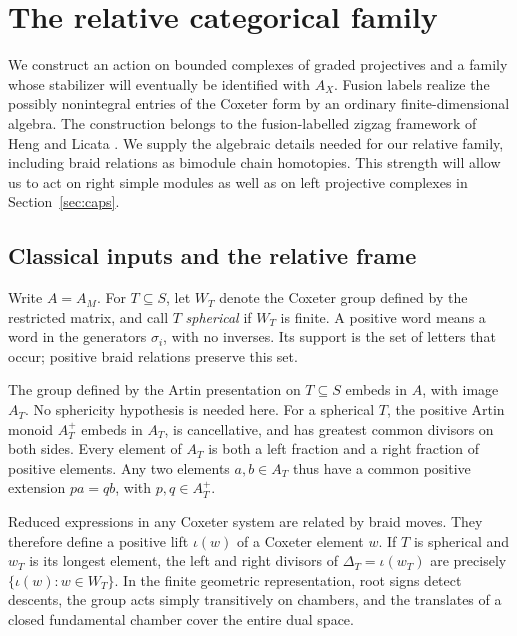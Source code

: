 \section{The relative categorical family}
\label{sec:category}

We construct an action on bounded complexes of graded projectives and a
family whose stabilizer will eventually be identified with $A_X$.  Fusion
labels realize the possibly nonintegral entries of the Coxeter form by
an ordinary finite-dimensional algebra.  The construction belongs to the
fusion-labelled zigzag framework of Heng and Licata
\cite[Sections~4--5]{HengLicata2024}.  We supply the algebraic details
needed for our relative family, including braid relations as bimodule
chain homotopies.  This strength will allow us to act on right simple
modules as well as on left projective complexes in Section~\ref{sec:caps}.

\subsection{Classical inputs and the relative frame}

Write $A=A_M$.  For $T\subseteq S$, let $W_T$ denote the Coxeter group
defined by the restricted matrix, and call $T$ \emph{spherical} if
$W_T$ is finite.  A positive word means a word in the generators
$\sigma_i$, with no inverses.  Its support is the set of letters that
occur; positive braid relations preserve this set.

\begin{theorem}
\label{cat:classical}
The group defined by the Artin presentation on $T\subseteq S$ embeds
in $A$, with image $A_T$.  No sphericity hypothesis is needed here.
For a spherical $T$, the positive Artin monoid $A_T^+$ embeds in
$A_T$, is cancellative, and has greatest common divisors on both
sides.  Every element of $A_T$ is both a left fraction and a right
fraction of positive elements.  Any two elements $a,b\in A_T$ thus
have a common positive extension $pa=qb$, with $p,q\in A_T^+$.

Reduced expressions in any Coxeter system are related by braid moves.
They therefore define a positive lift $\iota(w)$ of a Coxeter element
$w$.  If $T$ is spherical and $w_T$ is its longest element, the left
and right divisors of $\Delta_T=\iota(w_T)$ are precisely
$\{\iota(w):w\in W_T\}$.  In the finite geometric representation,
root signs detect descents, the group acts simply transitively on
chambers, and the translates of a closed fundamental chamber cover
the entire dual space.
\end{theorem}

